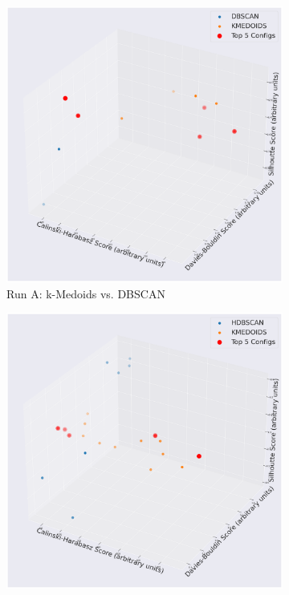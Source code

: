 \documentclass[10pt,oneside]{report}
\begin{document}
\begin{figure}[H]
    \centering
    \begin{subfigure}[b]{0.48\textwidth}
        \centering
        \includegraphics[width=\textwidth]{./images/nomic_kmedoidsvsdbscan.png}
        \caption{Run A: k-Medoids vs. DBSCAN}
        \label{fig:nomic_kmedoids_vs_dbscan_h2h_config} 
    \end{subfigure}
    \hfill
    \begin{subfigure}[b]{0.48\textwidth}
        \centering
        \includegraphics[width=\textwidth]{./images/nomic_kmedoidsvshdbscan.png}

\end{subfigure}
\end{figure}
\end{document}
